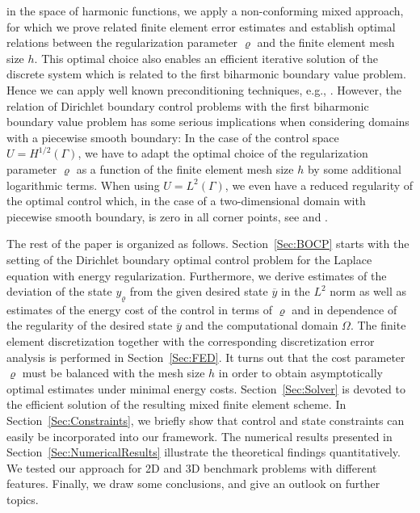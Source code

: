 \documentclass{article}
\numberwithin{equation}{section}
\begin{document}
in the space of harmonic functions, we apply a non-conforming mixed approach,
for which we prove related finite element error estimates and establish
optimal relations between the regularization parameter $\varrho$ and the
finite element mesh size $h$. This optimal choice also enables an
efficient iterative solution of the discrete system which is related to the
first biharmonic boundary value problem. Hence we can apply well known
preconditioning techniques, e.g.,
\cite{BraessPeisker:1986IMAJNA,GlowinskiPironneau:1979SIAMRev,
  Langer1986NumerMath,Peisker1988M2AN}. However, the relation of
Dirichlet boundary control problems with the first biharmonic boundary
value problem has some serious implications when considering domains
with a piecewise smooth boundary: In the case of the control space
$U=H^{1/2}(\Gamma)$, we have to adapt the optimal choice of the
regularization parameter $\varrho$ as a function of the finite element
mesh size $h$ by some additional logarithmic terms.
When using $U = L^2(\Gamma)$, we even have a reduced regularity of the
optimal control which, in the case of a two-dimensional domain with
piecewise smooth boundary, is zero in all corner points, see
\cite[Remark 1]{MayRannacherVexler2013SICO} and
\cite[Figure 3]{OfPhanSteinbach2015NumerMath}.

The rest of the paper is organized as follows. Section~\ref{Sec:BOCP}
starts with the setting of the Dirichlet boundary optimal 
control problem for the Laplace equation with energy regularization. 
Furthermore, we derive estimates of the deviation of the state $y_\varrho$ 
from the given desired state $\overline{y}$ in the $L^2$ norm as well as 
estimates of the energy cost of the control in terms of $\varrho$ 
and in dependence of the regularity of the desired state $\overline{y}$
and the computational domain $\Omega$. 
The finite element discretization together with the corresponding 
discretization error analysis is 
performed in Section~\ref{Sec:FED}. It turns out that the cost parameter $\varrho$
must be balanced with the mesh size $h$ in order to obtain asymptotically 
optimal estimates under minimal energy costs.
Section~\ref{Sec:Solver} is devoted to the efficient solution 
of the resulting mixed finite element scheme. 
In Section~\ref{Sec:Constraints}, we briefly show that control and state constraints
can easily be incorporated into our framework. 
The numerical results presented in Section~\ref{Sec:NumericalResults} 
illustrate the theoretical findings quantitatively.
We tested our approach for 2D and 3D benchmark problems with different
features. 
Finally, we draw some conclusions, and give an outlook on further topics.
\end{document}
